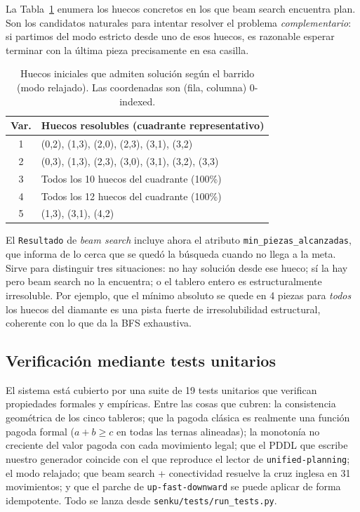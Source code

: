 \documentclass[conference,a4paper]{IEEEtran}
\begin{document}
La Tabla~\ref{tab:huecos-detalle} enumera los huecos concretos en los
que beam search encuentra plan. Son los candidatos naturales para
intentar resolver el problema \emph{complementario}: si partimos del
modo estricto desde uno de esos huecos, es razonable esperar terminar
con la última pieza precisamente en esa casilla.

\begin{table}[!htbp]
\caption{Huecos iniciales que admiten solución según el barrido (modo relajado). Las coordenadas son (fila, columna) 0-indexed.}
\label{tab:huecos-detalle}
\centering
\small
\begin{tabular}{cp{5.5cm}}
\toprule
\textbf{Var.} & \textbf{Huecos resolubles (cuadrante representativo)} \\
\midrule
1 & (0,2), (1,3), (2,0), (2,3), (3,1), (3,2) \\
2 & (0,3), (1,3), (2,3), (3,0), (3,1), (3,2), (3,3) \\
3 & Todos los 10 huecos del cuadrante (100\%) \\
4 & Todos los 12 huecos del cuadrante (100\%) \\
5 & (1,3), (3,1), (4,2) \\
\bottomrule
\end{tabular}
\end{table}

El \texttt{Resultado} de \emph{beam search} incluye ahora el atributo
\texttt{min\_piezas\_alcanzadas}, que informa de lo cerca que se quedó
la búsqueda cuando no llega a la meta. Sirve para distinguir tres
situaciones: no hay solución desde ese hueco; sí la hay pero beam
search no la encuentra; o el tablero entero es estructuralmente
irresoluble. Por ejemplo, que el mínimo absoluto se quede en 4 piezas
para \emph{todos} los huecos del diamante es una pista fuerte de
irresolubilidad estructural, coherente con lo que da la BFS exhaustiva.

\subsection{Verificación mediante tests unitarios}

El sistema está cubierto por una suite de 19 tests unitarios que
verifican propiedades formales y empíricas. Entre las cosas que cubren:
la consistencia geométrica de los cinco tableros; que la pagoda clásica
es realmente una función pagoda formal ($a+b\geq c$ en todas las ternas
alineadas); la monotonía no creciente del valor pagoda con cada
movimiento legal; que el PDDL que escribe nuestro generador coincide con
el que reproduce el lector de \texttt{unified-planning}; el modo
relajado; que beam search + conectividad resuelve la cruz inglesa en 31
movimientos; y que el parche de \texttt{up-fast-downward} se puede
aplicar de forma idempotente. Todo se lanza desde
\texttt{senku/tests/run\_tests.py}.
\end{document}
